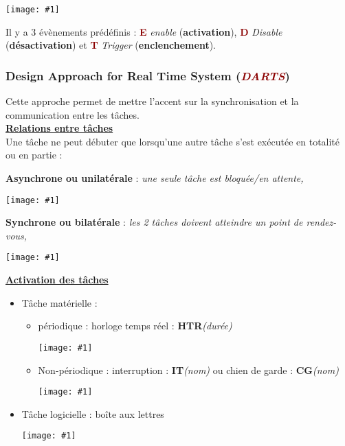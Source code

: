 \documentclass{article}
\newcommand{\dred}[1]{\textcolor{darkred}{\textbf{#1}}}
\newcommand{\red}[1]{\textcolor{darkred}{#1}}
\newcommand{\imgR}[2]{\begin{center}\texttt{[image: \#1]}\end{center}}
\newcommand{\stitre}[1]{\noindent\textbf{\underline{#1}} \\}
\begin{document}
\imgR{img/ITR_007.png}{400}

\noindent Il y a 3 évènements prédéfinis : \dred{E} \textit{enable} (\textbf{activation}), \dred{D} 
\textit{Disable} (\textbf{désactivation}) et \dred{T} \textit{Trigger} (\textbf{enclenchement}).

\subsubsection{Design Approach for Real Time System (\textit{\red{DARTS}})}

Cette approche permet de mettre l'accent sur la synchronisation et la communication entre les tâches.\\

\stitre{Relations entre tâches}

Une tâche ne peut débuter que lorsqu'une autre tâche s'est exécutée en totalité ou en partie :

\begin{multicols}{2}
\textbf{Asynchrone ou unilatérale} : \textit{une seule tâche est bloquée/en attente,}
\imgR{img/ITR_008.png}{150}
\end{multicols}

\begin{multicols}{2}
\textbf{Synchrone ou bilatérale} : \textit{les 2 tâches doivent atteindre un point de rendez-vous,}
\imgR{img/ITR_009.png}{150}
\end{multicols}

\stitre{Activation des tâches}

\begin{itemize}
\item Tâche matérielle :
	\begin{itemize}
	\item \begin{multicols}{2}
			périodique : horloge temps réel : \textbf{HTR}\textit{(durée)}
			\imgR{img/ITR_010.png}{150}
		  \end{multicols}
  	\item \begin{multicols}{2}
			Non-périodique : interruption : \textbf{IT}\textit{(nom)} ou chien de garde : 
			\textbf{CG}\textit{(nom)}
			\imgR{img/ITR_011.png}{150}
		  \end{multicols}
	\end{itemize}
\item Tâche logicielle : boîte aux lettres \\
\imgR{img/ITR_012.png}{225}
\end{itemize}
\end{document}
